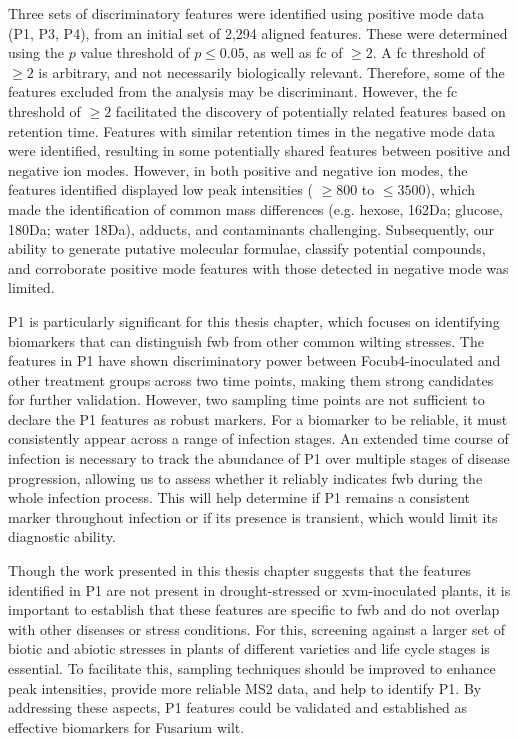 Three sets of discriminatory features were identified using positive mode data (P1, P3, P4), from an initial set of 2,294 aligned features. These were determined using the $p$ value threshold of $p \le 0.05$, as well as \ac{fc} of $\geq2$. A \ac{fc} threshold of $\geq2$ is arbitrary, and not necessarily biologically relevant. Therefore, some of the features excluded from the analysis may be discriminant. However, the \ac{fc} threshold of $\geq2$ facilitated the discovery of potentially related features based on retention time. Features with similar retention times in the negative mode data were identified, resulting in some potentially shared features between positive and negative ion modes. However, in both positive and negative ion modes, the features identified displayed low peak intensities ( $\geq800$ to $\leq3500$), which made the identification of common mass differences (e.g. hexose, 162Da; glucose, 180Da; water 18Da), adducts, and contaminants challenging. Subsequently, our ability to generate putative molecular formulae, classify potential compounds, and corroborate positive mode features with those detected in negative mode was limited.  

P1 is particularly significant for this thesis chapter, which focuses on identifying biomarkers that can distinguish \ac{fwb} from other common wilting stresses. The features in P1 have shown discriminatory power between \ac{Focub4}-inoculated and other treatment groups across two time points, making them strong candidates for further validation. However, two sampling time points are not sufficient to declare the P1 features as robust markers. For a biomarker to be reliable, it must consistently appear across a range of infection stages. An extended time course of infection is necessary to track the abundance of P1 over multiple stages of disease progression, allowing us to assess whether it reliably indicates \ac{fwb} during the whole infection process. This will help determine if P1 remains a consistent marker throughout infection or if its presence is transient, which would limit its diagnostic ability.

Though the work presented in this thesis chapter suggests that the features identified in P1 are not present in drought-stressed or \ac{xvm}-inoculated plants, it is important to establish that these features are specific to \ac{fwb} and do not overlap with other diseases or stress conditions. For this, screening against a larger set of biotic and abiotic stresses in plants of different varieties and life cycle stages is essential. To facilitate this, sampling techniques should be improved to enhance peak intensities, provide more reliable MS2 data, and help to identify P1. By addressing these aspects, P1 features could be validated and established as effective biomarkers for Fusarium wilt.

